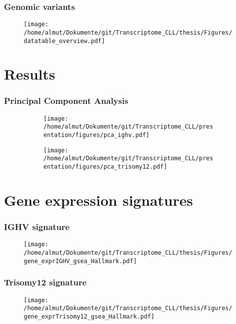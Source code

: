 \documentclass[xcolor=dvipsnames,t,10pt]{beamer}
\begin{document}
%
%
%
\begin{frame}[c]
	\frametitle{Genomic variants}
	\begin{figure}
		\centering
		\texttt{[image: /home/almut/Dokumente/git/Transcriptome\_CLL/thesis/Figures/datatable\_overview.pdf]}
	\end{figure}
\end{frame}
%
%
%
\section{Results}
%
%
%
%
\begin{frame}[c]
	\frametitle{Principal Component Analysis}
	\begin{figure}
		\centering
		\begin{subfigure}[t]{0.45\columnwidth}
		\texttt{[image: /home/almut/Dokumente/git/Transcriptome\_CLL/presentation/figures/pca\_ighv.pdf]}
		\end{subfigure}
		\hfill
		\begin{subfigure}[t]{0.45\columnwidth}
		\texttt{[image: /home/almut/Dokumente/git/Transcriptome\_CLL/presentation/figures/pca\_trisomy12.pdf]}
		\end{subfigure}
	\end{figure}
\end{frame}
% 
%
\section{Gene expression signatures}
%
%
\begin{frame}[c]
	\frametitle{IGHV signature}
	\begin{figure}
		\centering
		\texttt{[image: /home/almut/Dokumente/git/Transcriptome\_CLL/thesis/Figures/gene\_exprIGHV\_gsea\_Hallmark.pdf]}
	\end{figure}
\end{frame}
%
%
\begin{frame}[c]
	\frametitle{Trisomy12 signature}
	\begin{figure}
		\centering
		\texttt{[image: /home/almut/Dokumente/git/Transcriptome\_CLL/thesis/Figures/gene\_exprTrisomy12\_gsea\_Hallmark.pdf]}
	\end{figure}
\end{frame}
%
\end{document}
